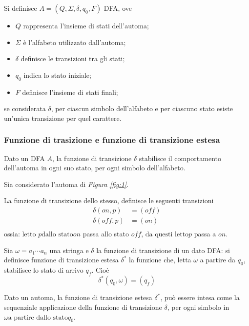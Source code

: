 \documentclass{subfiles}
\begin{document}
\begin{Definition*}
    Si definisce \(A = (Q, \Sigma, \delta, q_{0}, F)\) DFA, ove
    \begin{itemize}
        \item \emph{\(Q\)} rappresenta l'insieme di stati dell'automa;
        \item \emph{\(\Sigma\)} è l'alfabeto utilizzato dall'automa;
        \item \emph{\(\delta\)} definisce le transizioni tra gli stati;
        \item \emph{\(q_{0}\)} indica lo stato iniziale;
        \item \emph{\(F\)} definisce l'insieme di stati finali;
    \end{itemize}
    se considerata \(\delta\), per ciascun simbolo dell'alfabeto e per ciascuno stato esiste un'unica transizione per quel carattere.
\end{Definition*}

\subsubsection{Funzione di trasizione e funzione di transizione estesa}
Dato un DFA \(A\), la funzione di transizione \(\delta\) stabilisce il comportamento dell'automa in ogni suo stato, per ogni simbolo dell'alfabeto.
\begin{Example*}
    Sia considerato l'automa di \emph{Figura \eqref{fig:1}}.

    \noindent La funzione di transizione dello stesso, definisce le seguenti transizioni
    \[\begin{aligned}
            \delta(on, p)  & = (off) \\
            \delta(off, p) & = (on)  \\
        \end{aligned}\]
    ossia: letto \(p \text{dallo stato} on\) passa allo stato \(off \text{, da questi letto} p\) passa a \(on\).
\end{Example*}

\begin{Definition*}
    Sia \(\omega = a_{1} \cdots a_{n}\) una stringa e \(\delta\) la funzione di transizione di un dato DFA:
    si definisce funzione di transizione estesa \(\delta^{*}\) la funzione che, letta \(\omega\) a partire da \(q_{0}\), stabilisce lo stato di arrivo \(q_{f}\). Cioè
    \[
        \delta^{*}(q_{0}, \omega) = (q_{f})
    \]

    \begin{Remark*}
        Dato un automa, la funzione di transizione estesa \(\delta^{*}\), può essere intesa come la sequenziale applicazione della funzione di transizione \(\delta\),
        per ogni simbolo in \(\omega \text{a partire dallo stato} q_{0}\).
    \end{Remark*}
\end{Definition*}
\end{document}
